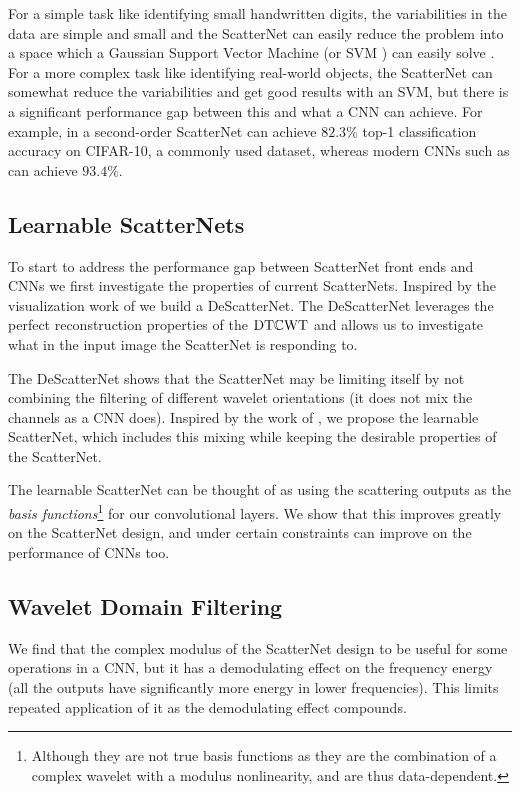 For a simple task like identifying small handwritten digits,
the variabilities in the data are simple and small and the ScatterNet can easily
reduce the problem into a space which a Gaussian Support Vector Machine (or SVM
\cite{cortes_support-vector_1995}) can easily solve
\cite{bruna_invariant_2013}. For a more complex task like identifying real-world
objects, the ScatterNet can somewhat reduce the variabilities and get good
results with an SVM, but there is a significant performance gap between this and
what a CNN can achieve. For example, in \cite{oyallon_deep_2015} a second-order
ScatterNet can achieve $82.3\%$ top-1 classification accuracy on CIFAR-10, a
commonly used dataset, whereas modern CNNs such as \cite{he_deep_2016} can
achieve $93.4\%$. 

\subsection{Learnable ScatterNets}
To start to address the performance gap between ScatterNet front ends and CNNs
we first investigate the properties of current ScatterNets. Inspired by the
visualization work of \citeauthor{zeiler_visualizing_2014}
\cite{zeiler_visualizing_2014} we build a DeScatterNet. The DeScatterNet
leverages the perfect reconstruction properties of the $\mathrm{DT}\mathbb{C}\mathrm{WT}$ and allows us to
investigate what in the input image the ScatterNet is responding to. 

The DeScatterNet shows that the ScatterNet may be limiting itself by not
combining the filtering of different wavelet orientations (it does not mix the
channels as a CNN does). Inspired by the work of \cite{qiu_dcfnet:_2018}, we
propose the learnable ScatterNet, which includes this mixing while keeping the 
desirable properties of the ScatterNet. 

The learnable ScatterNet can be thought of as using the scattering outputs as
the \emph{basis functions}\footnote{Although they are not true basis functions
as they are the combination of a complex wavelet with a modulus nonlinearity,
and are thus data-dependent.} for our convolutional layers. We show that this
improves greatly on the ScatterNet design, and under certain constraints can
improve on the performance of CNNs too.

\subsection{Wavelet Domain Filtering}
We find that the complex modulus of the ScatterNet design to be useful for some
operations in a CNN, but it has a demodulating effect on the frequency energy
(all the outputs have significantly more energy in lower frequencies). This
limits repeated application of it as the demodulating effect compounds.


